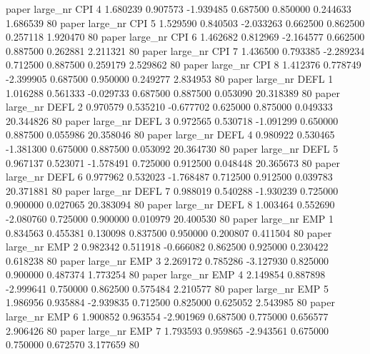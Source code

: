               paper   large_nr      CPI                 4  1.680239  0.907573  -1.939485 0.687500 0.850000  0.244633    1.686539 80
              paper   large_nr      CPI                 5  1.529590  0.840503  -2.033263 0.662500 0.862500  0.257118    1.920470 80
              paper   large_nr      CPI                 6  1.462682  0.812969  -2.164577 0.662500 0.887500  0.262881    2.211321 80
              paper   large_nr      CPI                 7  1.436500  0.793385  -2.289234 0.712500 0.887500  0.259179    2.529862 80
              paper   large_nr      CPI                 8  1.412376  0.778749  -2.399905 0.687500 0.950000  0.249277    2.834953 80
              paper   large_nr     DEFL                 1  1.016288  0.561333  -0.029733 0.687500 0.887500  0.053090   20.318389 80
              paper   large_nr     DEFL                 2  0.970579  0.535210  -0.677702 0.625000 0.875000  0.049333   20.344826 80
              paper   large_nr     DEFL                 3  0.972565  0.530718  -1.091299 0.650000 0.887500  0.055986   20.358046 80
              paper   large_nr     DEFL                 4  0.980922  0.530465  -1.381300 0.675000 0.887500  0.053092   20.364730 80
              paper   large_nr     DEFL                 5  0.967137  0.523071  -1.578491 0.725000 0.912500  0.048448   20.365673 80
              paper   large_nr     DEFL                 6  0.977962  0.532023  -1.768487 0.712500 0.912500  0.039783   20.371881 80
              paper   large_nr     DEFL                 7  0.988019  0.540288  -1.930239 0.725000 0.900000  0.027065   20.383094 80
              paper   large_nr     DEFL                 8  1.003464  0.552690  -2.080760 0.725000 0.900000  0.010979   20.400530 80
              paper   large_nr      EMP                 1  0.834563  0.455381   0.130098 0.837500 0.950000  0.200807    0.411504 80
              paper   large_nr      EMP                 2  0.982342  0.511918  -0.666082 0.862500 0.925000  0.230422    0.618238 80
              paper   large_nr      EMP                 3  2.269172  0.785286  -3.127930 0.825000 0.900000  0.487374    1.773254 80
              paper   large_nr      EMP                 4  2.149854  0.887898  -2.999641 0.750000 0.862500  0.575484    2.210577 80
              paper   large_nr      EMP                 5  1.986956  0.935884  -2.939835 0.712500 0.825000  0.625052    2.543985 80
              paper   large_nr      EMP                 6  1.900852  0.963554  -2.901969 0.687500 0.775000  0.656577    2.906426 80
              paper   large_nr      EMP                 7  1.793593  0.959865  -2.943561 0.675000 0.750000  0.672570    3.177659 80
